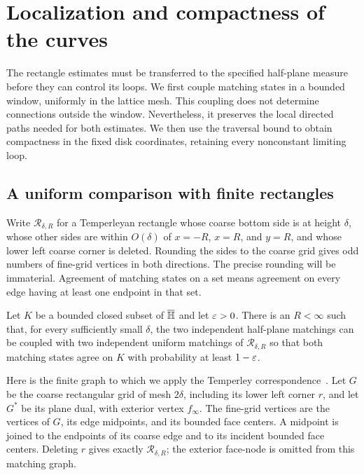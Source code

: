 \section{Localization and compactness of the curves}
\label{sec:localization}

The rectangle estimates must be transferred to the specified half-plane
measure before they can control its loops.  We first couple matching
states in a bounded window, uniformly in the lattice mesh.  This coupling
does not determine connections outside the window.  Nevertheless, it
preserves the local directed paths needed for both estimates.  We then
use the traversal bound to obtain compactness in the fixed disk
coordinates, retaining every nonconstant limiting loop.

\subsection{A uniform comparison with finite rectangles}

Write $\mathcal R_{\delta,R}$ for a Temperleyan rectangle whose coarse
bottom side is at height $\delta$, whose other sides are within $O(\delta)$
of $x=-R$, $x=R$, and $y=R$, and whose lower left coarse corner is deleted.
Rounding the sides to the coarse grid gives odd numbers of fine-grid
vertices in both directions.  The precise rounding will be immaterial.
Agreement of matching states on a set means agreement on every edge
having at least one endpoint in that set.

\begin{proposition}
\label{prop:localization}
Let $K$ be a bounded closed subset of $\overline{\mathbb H}$ and let $\varepsilon>0$.
There is an $R<\infty$ such that, for every sufficiently small $\delta$,
the two independent half-plane matchings can be coupled with two
independent uniform matchings of $\mathcal R_{\delta,R}$ so that both
matching states agree on $K$ with probability at least $1-\varepsilon$.
\end{proposition}

Here is the finite graph to which we apply the Temperley
correspondence~\cite[Theorem~1]{KPW}. Let $G$ be the coarse rectangular
grid of mesh $2\delta$, including its lower left corner $r$, and let
$G^*$ be its plane dual, with exterior vertex $f_\infty$. The fine-grid
vertices are the vertices of $G$, its edge midpoints, and its bounded
face centers. A midpoint is joined to the endpoints of its coarse edge
and to its incident bounded face centers. Deleting $r$ gives exactly
$\mathcal R_{\delta,R}$; the exterior face-node is omitted from this
matching graph.

